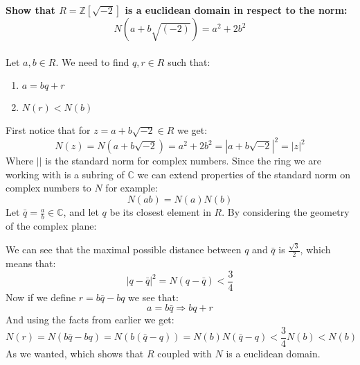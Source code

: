 \documentclass{article}
\theoremstyle{plain}
\newcommand{\Z}{\mathbb{Z}}
\newcommand{\C}{\mathbb{C}}
\begin{document}
	\textbf{Show that $R=\Z[\sqrt{-2}]$ is a euclidean domain in respect to 
	the norm: 
	\[ N(a + b\sqrt{(-2)}) = a^2 + 2b^2 \]} \\
	Let $a,b\in R$. We need to find $q,r\in R$ such that:
	\begin{enumerate}
		\item $a = bq + r$
		\item $N(r) < N(b)$
	\end{enumerate}
	First notice that for $z=a+b\sqrt{-2}\in R$ we get:
	\[
		N(z) = N(a+b\sqrt{-2}) = a^2 + 2b^2 = 
		\left|a + b\sqrt{-2}\right|^2 = |z|^2
	\]
	Where $||$ is the standard norm for complex numbers. Since the ring we 
	are working with is a subring of $\C$ we can extend properties of the 
	standard norm on complex numbers to $N$ for example:
	\[
		N(ab) = N(a)N(b)
	\]
	Let $\bar{q} = \frac{a}{b} \in \C$, and let $q$ be its closest element in
	$R$. By considering the geometry of the complex plane:
\begin{center}
\end{center}
	We can see that the maximal possible distance between $q$ and $\bar{q}$
	is $\frac{\sqrt{3}}{2}$, which means that:
	\[
		|q-\bar{q}|^2 = N(q-\bar{q}) < \frac{3}{4}
	\]
	Now if we define $r = b\bar{q} - bq$ we see that:
	\[
		a = b\bar{q} \Rightarrow bq + r
	\]
	And using the facts from earlier we get:
	\[
		N(r) = N(b\bar{q} - bq) = N(b(\bar{q} - q)) = N(b)N(\bar{q} - q) < 
		\frac{3}{4} N(b) < N(b)
	\]
	As we wanted, which shows that $R$ coupled with $N$ is a euclidean domain.
	
\end{document}
